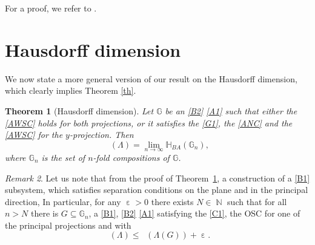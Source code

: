 \documentclass[a4paper, 11pt]{article}
\DeclareMathOperator{\N}{\mathbb{N}}
\DeclareMathOperator{\eps}{\varepsilon}
\DeclareMathOperator{\dH}{\dim_{\mathrm{H}}}
\numberwithin{equation}{section}
\theoremstyle{plain}
\newtheorem{theorem}{Theorem}[section]
\theoremstyle{remark}
\newtheorem{remark}[theorem]{Remark}
\theoremstyle{definition}
\begin{document}
For a proof, we refer to \cite[Proposition~3.5]{simon2017dimensionsoverlappinggeneralizationbaranski}.








\vspace{15 pt}




\section{Hausdorff dimension}

We now state a more general version of our result on the Hausdorff dimension, which clearly implies Theorem \ref{th}.

\begin{theorem}[Hausdorff dimension] \label{T2}
Let $\mathbb{G}$ be an \ref{B2} \ref{A1} such that either the \ref{AWSC} holds for both projections, or it satisfies the \ref{G1}, the \ref{ANC} and the \ref{AWSC} for the $y$-projection. Then
\begin{equation*}
\dH(\Lambda) = \lim_{n \to \infty} \mathbb{H}_{BA}(\mathbb{G}_n),
\end{equation*}
where $\mathbb{G}_n$ is the set of $n$-fold compositions of $\mathbb{G}$. 
\end{theorem}

\begin{remark}
    Let us note that from the proof of Theorem~\ref{T2}, a construction of a \ref{B1} subsystem, which satisfies separation conditions on the plane and in the principal direction, In particular, for any $\eps >0$ there exists $N \in \N$ such that for all $n>N$ there is $G \subseteq \mathbb{G}_n$, a \ref{B1}, \ref{B2} \ref{A1} satisfying the \ref{C1}, the OSC for one of the principal projections and with
\begin{equation*}
\dH(\Lambda) \leq \dH(\Lambda(G)) + \eps.
\end{equation*}
\end{remark}

\end{document}
